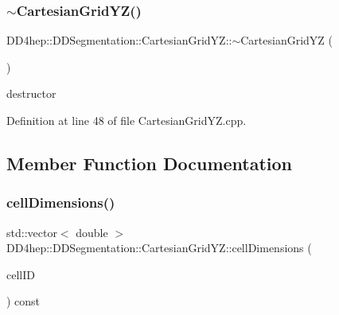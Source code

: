\hypertarget{class_d_d4hep_1_1_d_d_segmentation_1_1_cartesian_grid_y_z_a79289b0fc6f6ff298284ac1bb2266c79}{}\label{class_d_d4hep_1_1_d_d_segmentation_1_1_cartesian_grid_y_z_a79289b0fc6f6ff298284ac1bb2266c79} 
\subsubsection{\texorpdfstring{$\sim$\+Cartesian\+Grid\+Y\+Z()}{~CartesianGridYZ()}}
{\footnotesize\ttfamily D\+D4hep\+::\+D\+D\+Segmentation\+::\+Cartesian\+Grid\+Y\+Z\+::$\sim$\+Cartesian\+Grid\+YZ (\begin{DoxyParamCaption}{ }\end{DoxyParamCaption})\hspace{0.3cm}{\ttfamily [virtual]}}



destructor 



Definition at line 48 of file Cartesian\+Grid\+Y\+Z.\+cpp.



\subsection{Member Function Documentation}
\hypertarget{class_d_d4hep_1_1_d_d_segmentation_1_1_cartesian_grid_y_z_a60fd1dd0468b6edb24054f83c0e15445}{}\label{class_d_d4hep_1_1_d_d_segmentation_1_1_cartesian_grid_y_z_a60fd1dd0468b6edb24054f83c0e15445} 
\subsubsection{\texorpdfstring{cell\+Dimensions()}{cellDimensions()}}
{\footnotesize\ttfamily std\+::vector$<$ double $>$ D\+D4hep\+::\+D\+D\+Segmentation\+::\+Cartesian\+Grid\+Y\+Z\+::cell\+Dimensions (\begin{DoxyParamCaption}\item[{const \hyperlink{namespace_d_d4hep_1_1_d_d_segmentation_ac7af071d85cb48820914434a07e21ba1}{Cell\+ID} \&}]{cell\+ID }\end{DoxyParamCaption}) const\hspace{0.3cm}{\ttfamily [virtual]}}



